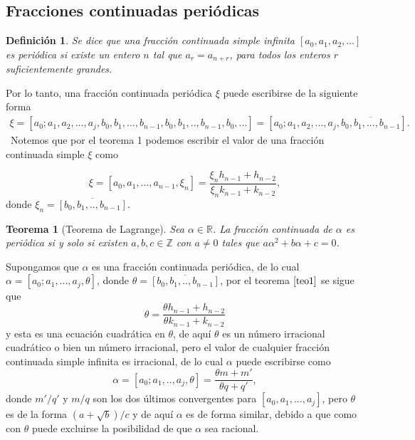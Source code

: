 \documentclass[11pt, article]{article}
\newtheorem{theorem}{Teorema} %
\newtheorem{definition}{Definición}
\begin{document}
    \subsection*{Fracciones continuadas periódicas}
    
    \begin{definition}
    Se dice que una fracción continuada simple infinita $[a_0,a_1,a_2,...]$ es periódica si existe un entero $n$ tal que $a_r=a_{n+r}$, para todos los enteros $r$ suficientemente grandes.
    \end{definition} 
    
    Por lo tanto, una fracción continuada periódica $\xi$ puede escribirse de la siguiente forma
        \begin{align*}
         \xi=[a_0;a_1,a_2,...,a_j,b_0,b_1,...,b_{n-1},b_0,b_1,..,b_{n-1},b_{0},...] 
        =[a_0;a_1,a_2,...,a_j,\overline{b_0,b_1,...,b_{n-1}}].
        \end{align*}
        \
        Notemos que por el teorema 1 podemos escribir el valor de una fracción continuada simple $\xi$ como 

    \begin{equation}
    \xi=[a_0,a_1,...,a_{n-1},\xi_n]=\dfrac{\xi_n h_{n-1} + h_{n-2}}{\xi_n k_{n-1} + k_{n-2}} , \label{ecuacion_8}
    \end{equation}
    donde $\xi_n=\overline{[b_0,b_1,..,b_{n-1}]}$.
    

    \begin{theorem}[Teorema de Lagrange] 
        Sea $\alpha \in \mathbb{R}$. La fracción continuada de $\alpha$ es periódica si y solo si existen $a, b, c \in\mathbb{Z}$ con $a\not=0$ tales que $a\alpha^2 + b\alpha + c = 0$.
    \end{theorem}

    Supongamos que $\alpha$ es una fracción continuada periódica, de lo cual $\alpha= [a_0;a_1,...,a_{j},\theta]$, donde $\theta=\overline{[b_0,b_1,..,b_{n-1}]}$, por el teorema $\ref{teo1}$ se sigue que
        \[
        \theta =\dfrac{\theta h_{n-1}+h_{n-2}}{\theta k_{n-1}+k_{n-2}}
        \]
    y esta es una ecuación cuadrática en $\theta$, de aquí $\theta$ es un número irracional cuadrático o bien un número irracional, pero el valor de cualquier fracción continuada simple infinita es irracional, de lo cual $\alpha$ puede escribirse como 
        \[
        \alpha = [a_0;a_1,..,a_j,\theta]=\dfrac{\theta m + m'}{\theta q + q'},
        \]
    donde $m'/q'$ y $m/q$ son los dos últimos convergentes para $[a_0,a_1,...,a_j]$, pero $\theta$ es de la forma $(a + \sqrt{b})/c$ y de aquí $\alpha$ es de forma similar, debido a que como con $\theta$ puede excluirse la posibilidad de que $\alpha$ sea racional.
\end{document}
